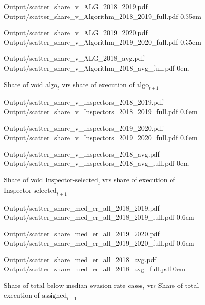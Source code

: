 \documentclass{article}
\newcommand{\OutPath}{Output/}%
\newcommand{\OutPath}{../Output/}%
\begin{document}
\begin{figure}[H]
    \centering
    \caption{Share of void $\text{algo}_t$ vrs share of execution of $\text{algo}_{t+1}$}

      {\OutPath scatter_share_v_ALG_2018_2019.pdf}
      {\OutPath scatter_share_v_Algorithm_2018_2019_full.pdf}
      {0.35em}

      {\OutPath scatter_share_v_ALG_2019_2020.pdf}
      {\OutPath scatter_share_v_Algorithm_2019_2020_full.pdf}
      {0.35em}

      {\OutPath scatter_share_v_ALG_2018_avg.pdf}
      {\OutPath scatter_share_v_Algorithm_2018_avg_full.pdf}
      {0em}
\end{figure}

\begin{figure}[H]
    \centering
    \caption{Share of void $\text{Inspector-selected}_t$ vrs share of execution of $\text{Inspector-selected}_{t+1}$}

      {\OutPath scatter_share_v_Inspectors_2018_2019.pdf}
      {\OutPath scatter_share_v_Inspectors_2018_2019_full.pdf}
      {0.6em}

      {\OutPath scatter_share_v_Inspectors_2019_2020.pdf}
      {\OutPath scatter_share_v_Inspectors_2019_2020_full.pdf}
      {0.6em}

      {\OutPath scatter_share_v_Inspectors_2018_avg.pdf}
      {\OutPath scatter_share_v_Inspectors_2018_avg_full.pdf}
      {0em}
\end{figure}


\begin{figure}[H]
    \centering
    \caption{Share of total $\text{below median evasion rate cases}_t$ vrs Share of total execution of $\text{assigned}_{t+1}$}

      {\OutPath scatter_share_med_er_all_2018_2019.pdf}
      {\OutPath scatter_share_med_er_all_2018_2019_full.pdf}
      {0.6em}

      {\OutPath scatter_share_med_er_all_2019_2020.pdf}
      {\OutPath scatter_share_med_er_all_2019_2020_full.pdf}
      {0.6em}

      {\OutPath scatter_share_med_er_all_2018_avg.pdf}
      {\OutPath scatter_share_med_er_all_2018_avg_full.pdf}
      {0em}
\end{figure}
\end{document}
